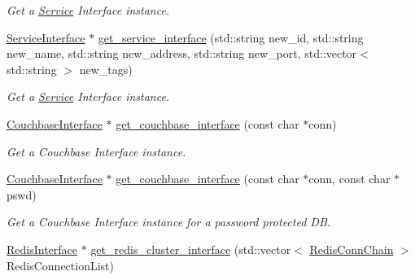 \begin{DoxyCompactItemize}
\begin{DoxyCompactList}\small\item\em Get a \hyperlink{classService}{Service} Interface instance. \end{DoxyCompactList}\item 
\hypertarget{classServiceComponentFactory_a3461ba8dac008cf74b117b626a1851b2}{\hyperlink{classServiceInterface}{Service\-Interface} $\ast$ \hyperlink{classServiceComponentFactory_a3461ba8dac008cf74b117b626a1851b2}{get\-\_\-service\-\_\-interface} (std\-::string new\-\_\-id, std\-::string new\-\_\-name, std\-::string new\-\_\-address, std\-::string new\-\_\-port, std\-::vector$<$ std\-::string $>$ new\-\_\-tags)}\label{classServiceComponentFactory_a3461ba8dac008cf74b117b626a1851b2}

\begin{DoxyCompactList}\small\item\em Get a \hyperlink{classService}{Service} Interface instance. \end{DoxyCompactList}\item 
\hypertarget{classServiceComponentFactory_ab0054b867f4ceb06217a035a8909ca65}{\hyperlink{classCouchbaseInterface}{Couchbase\-Interface} $\ast$ \hyperlink{classServiceComponentFactory_ab0054b867f4ceb06217a035a8909ca65}{get\-\_\-couchbase\-\_\-interface} (const char $\ast$conn)}\label{classServiceComponentFactory_ab0054b867f4ceb06217a035a8909ca65}

\begin{DoxyCompactList}\small\item\em Get a Couchbase Interface instance. \end{DoxyCompactList}\item 
\hypertarget{classServiceComponentFactory_ae0c38d94599bcf148704d3436a529d13}{\hyperlink{classCouchbaseInterface}{Couchbase\-Interface} $\ast$ \hyperlink{classServiceComponentFactory_ae0c38d94599bcf148704d3436a529d13}{get\-\_\-couchbase\-\_\-interface} (const char $\ast$conn, const char $\ast$pswd)}\label{classServiceComponentFactory_ae0c38d94599bcf148704d3436a529d13}

\begin{DoxyCompactList}\small\item\em Get a Couchbase Interface instance for a password protected D\-B. \end{DoxyCompactList}\item 
\hypertarget{classServiceComponentFactory_a960660c5cb312c1cdb6b20bd87c2e2d5}{\hyperlink{classRedisInterface}{Redis\-Interface} $\ast$ \hyperlink{classServiceComponentFactory_a960660c5cb312c1cdb6b20bd87c2e2d5}{get\-\_\-redis\-\_\-cluster\-\_\-interface} (std\-::vector$<$ \hyperlink{structRedisConnChain}{Redis\-Conn\-Chain} $>$ Redis\-Connection\-List)}\label{classServiceComponentFactory_a960660c5cb312c1cdb6b20bd87c2e2d5}


\end{DoxyCompactItemize}
